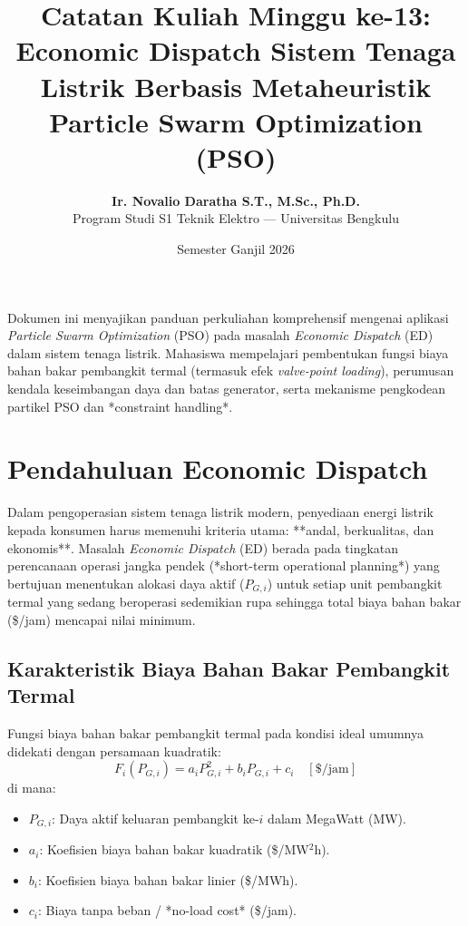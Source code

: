 \documentclass[11pt,a4paper]{article}
\title{\textbf{Catatan Kuliah Minggu ke-13:}\\Economic Dispatch Sistem Tenaga Listrik Berbasis Metaheuristik Particle Swarm Optimization (PSO)}
\author{\textbf{Ir. Novalio Daratha S.T., M.Sc., Ph.D.}\\Program Studi S1 Teknik Elektro --- Universitas Bengkulu}
\date{Semester Ganjil 2026}
\begin{document}
\maketitle

\begin{tcolorbox}[colback=unibblue!5,colframe=unibblue,title=\textbf{Ringkasan Eksekutif dan CPMK}]
Dokumen ini menyajikan panduan perkuliahan komprehensif mengenai aplikasi \textit{Particle Swarm Optimization} (PSO) pada masalah \textit{Economic Dispatch} (ED) dalam sistem tenaga listrik. Mahasiswa mempelajari pembentukan fungsi biaya bahan bakar pembangkit termal (termasuk efek \textit{valve-point loading}), perumusan kendala keseimbangan daya dan batas generator, serta mekanisme pengkodean partikel PSO dan *constraint handling*.
\end{tcolorbox}

\tableofcontents
\newpage

\section{Pendahuluan Economic Dispatch}
Dalam pengoperasian sistem tenaga listrik modern, penyediaan energi listrik kepada konsumen harus memenuhi kriteria utama: **andal, berkualitas, dan ekonomis**. Masalah \textit{Economic Dispatch} (ED) berada pada tingkatan perencanaan operasi jangka pendek (*short-term operational planning*) yang bertujuan menentukan alokasi daya aktif ($P_{G,i}$) untuk setiap unit pembangkit termal yang sedang beroperasi sedemikian rupa sehingga total biaya bahan bakar (\$/jam) mencapai nilai minimum.

\subsection{Karakteristik Biaya Bahan Bakar Pembangkit Termal}
Fungsi biaya bahan bakar pembangkit termal pada kondisi ideal umumnya didekati dengan persamaan kuadratik:
\begin{equation}
    F_i(P_{G,i}) = a_i P_{G,i}^2 + b_i P_{G,i} + c_i \quad [\text{\$/jam}]
\end{equation}
di mana:
\begin{itemize}
    \item $P_{G,i}$: Daya aktif keluaran pembangkit ke-$i$ dalam MegaWatt (MW).
    \item $a_i$: Koefisien biaya bahan bakar kuadratik (\$/MW$^2$h).
    \item $b_i$: Koefisien biaya bahan bakar linier (\$/MWh).
    \item $c_i$: Biaya tanpa beban / *no-load cost* (\$/jam).
\end{itemize}
\end{document}
